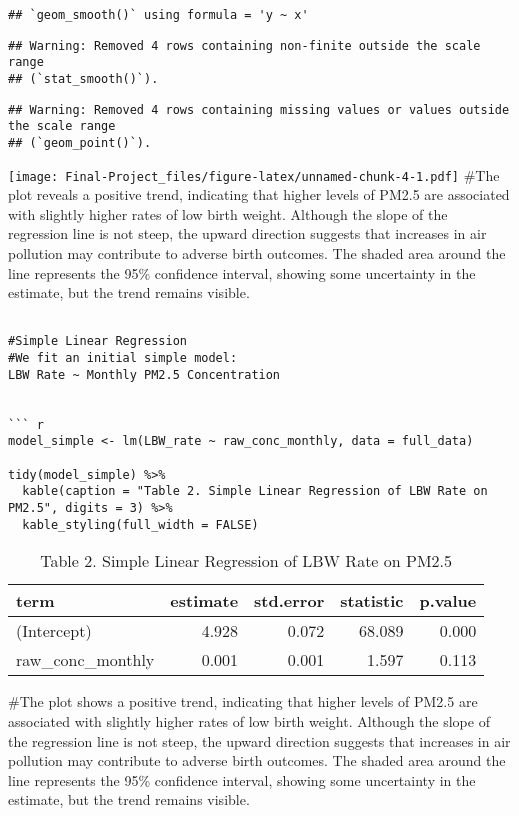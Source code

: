 \documentclass[
]{article}
\begin{document}
\begin{verbatim}
## `geom_smooth()` using formula = 'y ~ x'
\end{verbatim}

\begin{verbatim}
## Warning: Removed 4 rows containing non-finite outside the scale range
## (`stat_smooth()`).
\end{verbatim}

\begin{verbatim}
## Warning: Removed 4 rows containing missing values or values outside the scale range
## (`geom_point()`).
\end{verbatim}

\texttt{[image: Final-Project\_files/figure-latex/unnamed-chunk-4-1.pdf]}
\#The plot reveals a positive trend, indicating that higher levels of
PM2.5 are associated with slightly higher rates of low birth weight.
Although the slope of the regression line is not steep, the upward
direction suggests that increases in air pollution may contribute to
adverse birth outcomes. The shaded area around the line represents the
95\% confidence interval, showing some uncertainty in the estimate, but
the trend remains visible.

\begin{verbatim}

#Simple Linear Regression
#We fit an initial simple model:
LBW Rate ~ Monthly PM2.5 Concentration


``` r
model_simple <- lm(LBW_rate ~ raw_conc_monthly, data = full_data)

tidy(model_simple) %>%
  kable(caption = "Table 2. Simple Linear Regression of LBW Rate on PM2.5", digits = 3) %>%
  kable_styling(full_width = FALSE)
\end{verbatim}

\begin{longtable}[t]{lrrrr}
\caption{\label{tab:unnamed-chunk-5}Table 2. Simple Linear Regression of LBW Rate on PM2.5}\\
\toprule
term & estimate & std.error & statistic & p.value\\
\midrule
(Intercept) & 4.928 & 0.072 & 68.089 & 0.000\\
raw\_conc\_monthly & 0.001 & 0.001 & 1.597 & 0.113\\
\bottomrule
\end{longtable}

\#The plot shows a positive trend, indicating that higher levels of
PM2.5 are associated with slightly higher rates of low birth weight.
Although the slope of the regression line is not steep, the upward
direction suggests that increases in air pollution may contribute to
adverse birth outcomes. The shaded area around the line represents the
95\% confidence interval, showing some uncertainty in the estimate, but
the trend remains visible.
\end{document}
